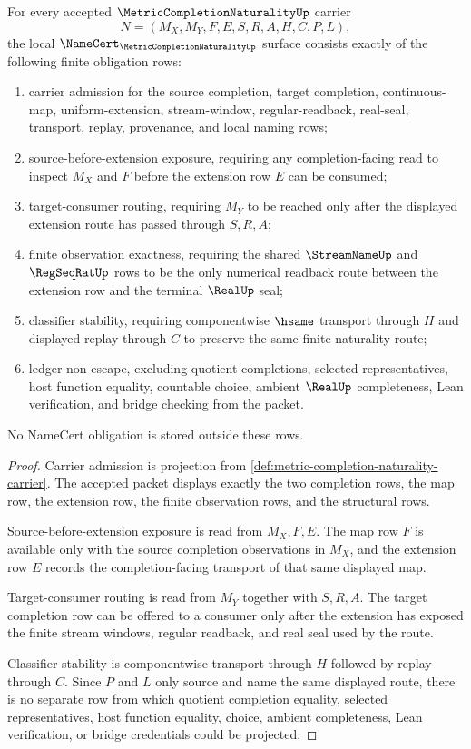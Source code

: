 \begin{theorem}
\label{thm:metric-completion-naturality-namecert-obligations}
For every accepted $\MetricCompletionNaturalityUp$ carrier
$$
N=(M_X,M_Y,F,E,S,R,A,H,C,P,L),
$$
the local $\NameCert_{\MetricCompletionNaturalityUp}$ surface consists exactly of the following finite obligation rows:
\begin{enumerate}
\item carrier admission for the source completion, target completion, continuous-map, uniform-extension, stream-window, regular-readback, real-seal, transport, replay, provenance, and local naming rows;
\item source-before-extension exposure, requiring any completion-facing read to inspect $M_X$ and $F$ before the extension row $E$ can be consumed;
\item target-consumer routing, requiring $M_Y$ to be reached only after the displayed extension route has passed through $S,R,A$;
\item finite observation exactness, requiring the shared $\StreamNameUp$ and $\RegSeqRatUp$ rows to be the only numerical readback route between the extension row and the terminal $\RealUp$ seal;
\item classifier stability, requiring componentwise $\hsame$ transport through $H$ and displayed replay through $C$ to preserve the same finite naturality route;
\item ledger non-escape, excluding quotient completions, selected representatives, host function equality, countable choice, ambient $\RealUp$ completeness, Lean verification, and bridge checking from the packet.
\end{enumerate}
No NameCert obligation is stored outside these rows.
\end{theorem}
\begin{proof}
Carrier admission is projection from \autoref{def:metric-completion-naturality-carrier}. The accepted packet displays exactly the two completion rows, the map row, the extension row, the finite observation rows, and the structural rows.

Source-before-extension exposure is read from $M_X,F,E$. The map row $F$ is available only with the source completion observations in $M_X$, and the extension row $E$ records the completion-facing transport of that same displayed map.

Target-consumer routing is read from $M_Y$ together with $S,R,A$. The target completion row can be offered to a consumer only after the extension has exposed the finite stream windows, regular readback, and real seal used by the route.

Classifier stability is componentwise transport through $H$ followed by replay through $C$. Since $P$ and $L$ only source and name the same displayed route, there is no separate row from which quotient completion equality, selected representatives, host function equality, choice, ambient completeness, Lean verification, or bridge credentials could be projected.
\end{proof}

